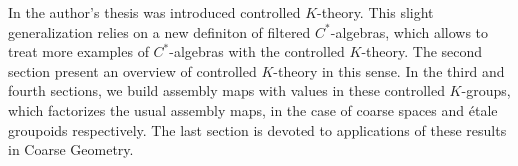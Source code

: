 In the author's thesis was introduced controlled $K$-theory. This slight generalization relies on a new definiton of filtered $C^*$-algebras, which allows to treat more examples of $C^*$-algebras with the controlled $K$-theory. The second section present an overview of controlled $K$-theory in this sense. In the third and fourth sections, we build assembly maps with values in these controlled $K$-groups, which factorizes the usual assembly maps, in the case of coarse spaces and étale groupoids respectively. The last section is devoted to applications of these results in Coarse Geometry.%
